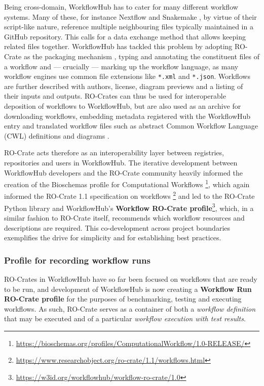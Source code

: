 Being cross-domain, WorkflowHub has to cater for many different workflow
systems. Many of these, for instance Nextflow
\cite{Di Tommaso 2017} and Snakemake
\cite{ch5-73}, by
virtue of their script-like nature, reference multiple neighbouring
files typically maintained in a GitHub repository. This calls for a data
exchange method that allows keeping related files together. WorkflowHub
has tackled this problem by adopting RO-Crate as the packaging mechanism
\cite{Bietrix 2021}, typing and
annotating the constituent files of a workflow and --- crucially ---
marking up the workflow language, as many workflow engines use common
file extensions like \texttt{*.xml} and \texttt{*.json}. Workflows are
further described with authors, license, diagram previews and a listing
of their inputs and outputs. RO-Crates can thus be used for
interoperable deposition of workflows to WorkflowHub, but are also used
as an archive for downloading workflows, embedding metadata registered
with the WorkflowHub entry and translated workflow files such as
abstract Common Workflow Language (CWL)
\cite{Crusoe 2022} definitions and
diagrams \cite{Goble 2021}.

RO-Crate acts therefore as an interoperability layer between registries,
repositories and users in WorkflowHub. The iterative development between
WorkflowHub developers and the RO-Crate community heavily informed the
creation of the Bioschemas
\cite{ch5-58} profile for Computational
Workflows \footnote{\url{https://bioschemas.org/profiles/ComputationalWorkflow/1.0-RELEASE/}}, which again informed the
RO-Crate
1.1 specification on workflows \footnote{\url{https://www.researchobject.org/ro-crate/1.1/workflows.html}} and led to the RO-Crate Python library
\cite{Droesbeke 2022} and
WorkflowHub's
\textbf{Workflow
RO-Crate profile}\footnote{\url{https://w3id.org/workflowhub/workflow-ro-crate/1.0}}, which, in a similar fashion to RO-Crate itself,
recommends which workflow resources and descriptions are required. This
co-development across project boundaries exemplifies the drive for
simplicity and for establishing best practices.

\subsubsection{Profile for recording workflow runs}
\label{ch5:profile-for-recording-workflow-runs}

RO-Crates in WorkflowHub have so far been focused on workflows that are
ready to be run, and development of WorkflowHub is now creating a
\textbf{Workflow Run RO-Crate profile} for the purposes of benchmarking,
testing and executing workflows. As such, RO-Crate serves as a container
of both a \emph{workflow definition} that may be executed and of a
particular \emph{workflow execution with test results}.


